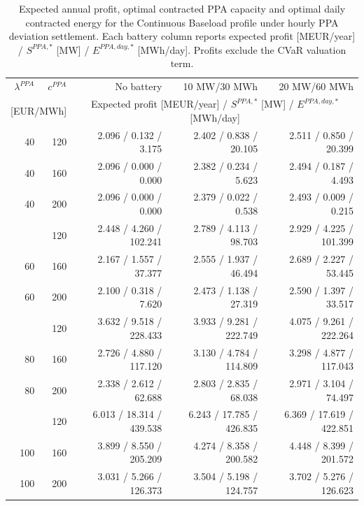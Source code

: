\begin{table}[htbp]
\centering
\small
\caption{Expected annual profit, optimal contracted PPA capacity and optimal daily contracted energy for the Continuous Baseload profile under hourly PPA deviation settlement. Each battery column reports expected profit [MEUR/year] / $S^{PPA,*}$ [MW] / $E^{PPA,day,*}$ [MWh/day]. Profits exclude the CVaR valuation term.}
\label{tab:battery_sensitivity_continuous_baseload}
\begin{tabular*}{\textwidth}{@{\extracolsep{\fill}}rrrrr@{}}
\toprule
$\lambda^{PPA}$ & $c^{PPA}$ & No battery & 10 MW/30 MWh & 20 MW/60 MWh \\
\multicolumn{2}{c}{[EUR/MWh]} & \multicolumn{3}{c}{Expected profit [MEUR/year] / $S^{PPA,*}$ [MW] / $E^{PPA,day,*}$ [MWh/day]} \\
\midrule
40 & 120 & 2.096 / 0.132 / 3.175 & 2.402 / 0.838 / 20.105 & 2.511 / 0.850 / 20.399 \\
40 & 160 & 2.096 / 0.000 / 0.000 & 2.382 / 0.234 / 5.623 & 2.494 / 0.187 / 4.493 \\
40 & 200 & 2.096 / 0.000 / 0.000 & 2.379 / 0.022 / 0.538 & 2.493 / 0.009 / 0.215 \\
\addlinespace
60 & 120 & 2.448 / 4.260 / 102.241 & 2.789 / 4.113 / 98.703 & 2.929 / 4.225 / 101.399 \\
60 & 160 & 2.167 / 1.557 / 37.377 & 2.555 / 1.937 / 46.494 & 2.689 / 2.227 / 53.445 \\
60 & 200 & 2.100 / 0.318 / 7.620 & 2.473 / 1.138 / 27.319 & 2.590 / 1.397 / 33.517 \\
\addlinespace
80 & 120 & 3.632 / 9.518 / 228.433 & 3.933 / 9.281 / 222.749 & 4.075 / 9.261 / 222.264 \\
80 & 160 & 2.726 / 4.880 / 117.120 & 3.130 / 4.784 / 114.809 & 3.298 / 4.877 / 117.043 \\
80 & 200 & 2.338 / 2.612 / 62.688 & 2.803 / 2.835 / 68.038 & 2.971 / 3.104 / 74.497 \\
\addlinespace
100 & 120 & 6.013 / 18.314 / 439.538 & 6.243 / 17.785 / 426.835 & 6.369 / 17.619 / 422.851 \\
100 & 160 & 3.899 / 8.550 / 205.209 & 4.274 / 8.358 / 200.582 & 4.448 / 8.399 / 201.572 \\
100 & 200 & 3.031 / 5.266 / 126.373 & 3.504 / 5.198 / 124.757 & 3.702 / 5.276 / 126.623 \\
\bottomrule
\end{tabular*}
\end{table}

